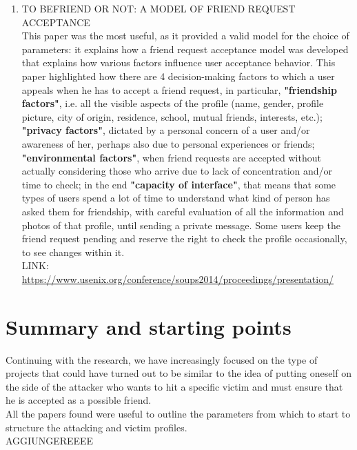 \begin{enumerate}
	\item 
	\textsc{TO BEFRIEND OR NOT: A MODEL OF FRIEND REQUEST ACCEPTANCE}
	\\ This paper was the most useful, as it provided a valid model for the choice of parameters: it explains how a friend request acceptance model was developed that explains how various factors influence user acceptance behavior. This paper highlighted how there are 4 decision-making factors to which a user appeals when he has to accept a friend request, in particular, \textbf{"friendship factors"}, i.e. all the visible aspects of the profile (name, gender, profile picture, city of origin, residence, school, mutual friends, interests, etc.); \textbf{"privacy factors"}, dictated by a personal concern of a user and/or awareness of her, perhaps also due to personal experiences or friends; \textbf{"environmental factors"}, when friend requests are accepted without actually considering those who arrive due to lack of concentration and/or time to check; in the end \textbf{"capacity of interface"}, that means that some types of users spend a lot of time to understand what kind of person has asked them for friendship, with careful evaluation of all the information and photos of that profile, until sending a private message. Some users keep the friend request pending and reserve the right to check the profile occasionally, to see changes within it.
	\\LINK: \href{https://www.usenix.org/conference/soups2014/proceedings/presentation/rashtian}{https://www.usenix.org/conference/soups2014/proceedings/presentation/}
\end{enumerate}

\section{Summary and starting points}
Continuing with the research, we have increasingly focused on the type of projects that could have turned out to be similar to the idea of putting oneself on the side of the attacker who wants to hit a specific victim and must ensure that he is accepted as a possible friend. \\All the papers found were useful to outline the parameters from which to start to structure the attacking and victim profiles.
\\AGGIUNGEREEEE